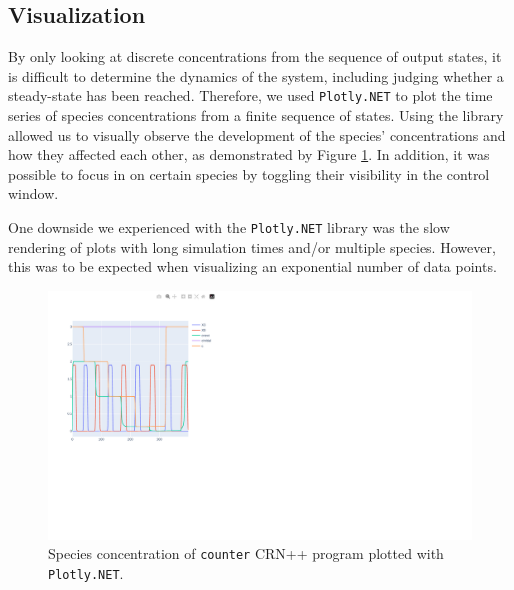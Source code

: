 \subsection{Visualization} %
By only looking at discrete concentrations from the sequence of output states, it is difficult to determine the dynamics of the system, including judging whether a steady-state has been reached. Therefore, we used \texttt{Plotly.NET} \cite{plotly} to plot the time series of species concentrations from a finite sequence of states. Using the library allowed us to visually observe the development of the species' concentrations and how they affected each other, as demonstrated by Figure \ref{fig:counter-plot}. In addition, it was possible to focus in on certain species by toggling their visibility in the control window. 

One downside we experienced with the \texttt{Plotly.NET} library was the slow rendering of plots with long simulation times and/or multiple species. However, this was to be expected when visualizing an exponential number of data points.

\begin{figure}[h]
    \centering
    \hspace{3em}\includegraphics[width=.7\textwidth]{Figures/counter-plot.pdf}
    \caption{Species concentration of \texttt{counter} CRN++ program plotted with \texttt{Plotly.NET}.}
    \label{fig:counter-plot}
\end{figure}
